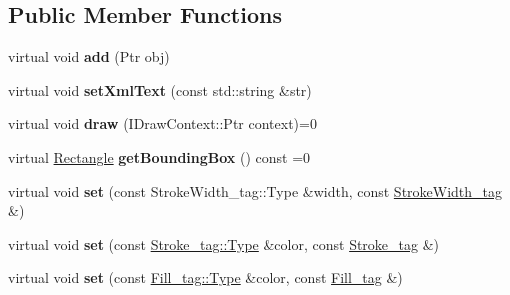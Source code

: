 \subsection*{Public Member Functions}
\begin{DoxyCompactItemize}
\item 
\hypertarget{classsambag_1_1disco_1_1svg_1_1_svg_object_ab413d4e961c20fb164ef10cfa01cfb53}{
virtual void {\bfseries add} (Ptr obj)}
\label{classsambag_1_1disco_1_1svg_1_1_svg_object_ab413d4e961c20fb164ef10cfa01cfb53}

\item 
\hypertarget{classsambag_1_1disco_1_1svg_1_1_svg_object_a17dfe153c81cd09b1e08b33d44cc4ef2}{
virtual void {\bfseries setXmlText} (const std::string \&str)}
\label{classsambag_1_1disco_1_1svg_1_1_svg_object_a17dfe153c81cd09b1e08b33d44cc4ef2}

\item 
\hypertarget{classsambag_1_1disco_1_1svg_1_1_svg_object_a42e6ae33457f1e7eaa9a5c31ae197e42}{
virtual void {\bfseries draw} (IDrawContext::Ptr context)=0}
\label{classsambag_1_1disco_1_1svg_1_1_svg_object_a42e6ae33457f1e7eaa9a5c31ae197e42}

\item 
\hypertarget{classsambag_1_1disco_1_1svg_1_1_svg_object_aa1dbea0f2f716828a19a18b0ef18b77b}{
virtual \hyperlink{classsambag_1_1com_1_1_rectangle}{Rectangle} {\bfseries getBoundingBox} () const =0}
\label{classsambag_1_1disco_1_1svg_1_1_svg_object_aa1dbea0f2f716828a19a18b0ef18b77b}

\item 
\hypertarget{classsambag_1_1disco_1_1svg_1_1_svg_object_abee1cd5d8cfcb9d7846aad0b5fca7384}{
virtual void {\bfseries set} (const StrokeWidth\_\-tag::Type \&width, const \hyperlink{structsambag_1_1disco_1_1svg_1_1_svg_object_1_1_stroke_width__tag}{StrokeWidth\_\-tag} \&)}
\label{classsambag_1_1disco_1_1svg_1_1_svg_object_abee1cd5d8cfcb9d7846aad0b5fca7384}

\item 
\hypertarget{classsambag_1_1disco_1_1svg_1_1_svg_object_aab0b180e22a531e6a125753c82eebd4f}{
virtual void {\bfseries set} (const \hyperlink{structsambag_1_1com_1_1_color_r_g_b_a}{Stroke\_\-tag::Type} \&color, const \hyperlink{structsambag_1_1disco_1_1svg_1_1_svg_object_1_1_stroke__tag}{Stroke\_\-tag} \&)}
\label{classsambag_1_1disco_1_1svg_1_1_svg_object_aab0b180e22a531e6a125753c82eebd4f}

\item 
\hypertarget{classsambag_1_1disco_1_1svg_1_1_svg_object_ab4bf18768e274d7382ac0bcc5603bbd8}{
virtual void {\bfseries set} (const \hyperlink{structsambag_1_1com_1_1_color_r_g_b_a}{Fill\_\-tag::Type} \&color, const \hyperlink{structsambag_1_1disco_1_1svg_1_1_svg_object_1_1_fill__tag}{Fill\_\-tag} \&)}
\label{classsambag_1_1disco_1_1svg_1_1_svg_object_ab4bf18768e274d7382ac0bcc5603bbd8}

\end{DoxyCompactItemize}
